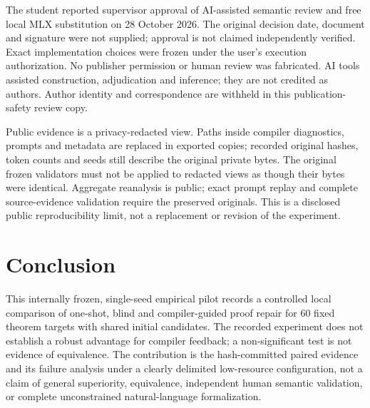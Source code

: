\documentclass[runningheads,a4paper]{llncs}
\begin{document}
The student reported supervisor approval of AI-assisted semantic review and
free local MLX substitution on 28 October 2026. The original decision date,
document and signature were not supplied; approval is not claimed independently
verified. Exact implementation choices were frozen under the user's execution
authorization. No publisher permission or human review was fabricated. AI tools
assisted construction, adjudication and inference; they are not credited as
authors. Author identity and correspondence are withheld in this publication-safety review copy.

Public evidence is a privacy-redacted view. Paths inside compiler diagnostics,
prompts and metadata are replaced in exported copies; recorded original hashes,
token counts and seeds still describe the original private bytes. The original
frozen validators must not be applied to redacted views as though their bytes
were identical. Aggregate reanalysis is public; exact prompt replay and complete
source-evidence validation require the preserved originals. This is a disclosed
public reproducibility limit, not a replacement or revision of the experiment.

\section{Conclusion}
This internally frozen, single-seed empirical pilot records a controlled local comparison of one-shot, blind and
compiler-guided proof repair for 60 fixed theorem targets with shared initial
candidates. The recorded experiment does not establish a robust advantage for compiler feedback; a non-significant test is not evidence of equivalence. The contribution is the hash-committed paired evidence
and its failure analysis under a clearly delimited low-resource configuration,
not a claim of general superiority, equivalence, independent human semantic validation, or
complete unconstrained natural-language formalization.



\end{document}
